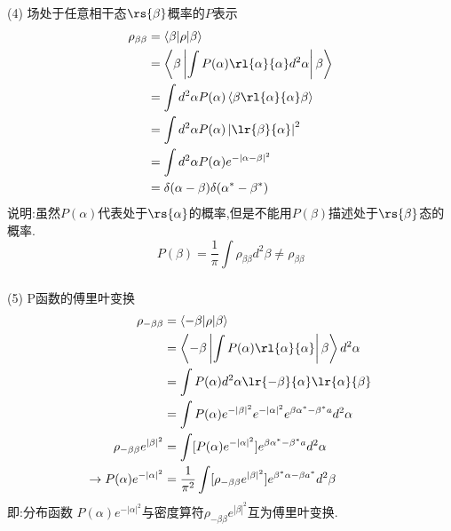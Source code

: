    \begin{frame} 
    \frametitle{}
    (4) 场处于任意相干态$\rs{\beta }$概率的$P$表示 
    \[ \begin{aligned}
        \rho_{\beta \beta} &= \left\langle \beta|\rho | \beta \right\rangle \\
        &=\left\langle \beta\left|\int P(\alpha) \rl{\alpha}{\alpha}  d^2 \alpha \right| \beta \right\rangle   \\
        &= \int  d^2 \alpha  P(\alpha) \left\langle \beta \rl{\alpha}{\alpha}\beta\right\rangle \\ 
        &= \int  d^2 \alpha  P(\alpha) \left|\lr{\beta}{\alpha} \right|^2 \\ 
        &= \int  d^2 \alpha  P(\alpha) e^{-\left|\alpha-\beta\right|^2} \\ 
        &= \delta(\alpha-\beta)\delta(\alpha^*-\beta^*)
    \end{aligned}\]  
    说明:虽然$P(\alpha)$代表处于$\rs{\alpha}$的概率,但是不能用$P(\beta)$描述处于$\rs{\beta}$态的概率. 
    \[ P(\beta) = \frac{1}{\pi} \int \rho_{\beta \beta}d^2 \beta \not = \rho_{\beta \beta} \]
   \end{frame}

\begin{frame} 
\frametitle{}
    (5) P函数的傅里叶变换
    \[ \begin{aligned}
      \rho_{-\beta \beta} &= \left\langle -\beta|\rho | \beta \right\rangle \\
    &= \left\langle -\beta \left|\int P(\alpha) \rl{\alpha}{\alpha} \right| \beta \right\rangle  d^2 \alpha  \\ 
    &= \int P(\alpha) d^2 \alpha \lr{-\beta}{\alpha} \lr{\alpha} {\beta} \\ 
    &=\int P(\alpha)  e^{-\left|\beta\right|^2} e^{-\left|\alpha\right|^2} e^{\beta \alpha^* - \beta^* a} d^2 \alpha\\ 
    \rho_{-\beta \beta} e^{\left|\beta\right|^2} &= \int [P(\alpha) e^{-\left|\alpha\right|^2}] e^{\beta \alpha^* - \beta^* a} d^2 \alpha\\  
    \to P(\alpha) e^{-\left|\alpha\right|^2}&= \frac{1}{\pi^2}\int [\rho_{-\beta \beta} e^{\left|\beta\right|^2} ] e^{\beta^* \alpha - \beta a^*} d^2 \beta
    \end{aligned}\]  
    即:分布函数 $P(\alpha) e^{-\left|\alpha\right|^2}$与密度算符$ \rho_{-\beta \beta} e^{\left|\beta\right|^2} $互为傅里叶变换.
\end{frame}

